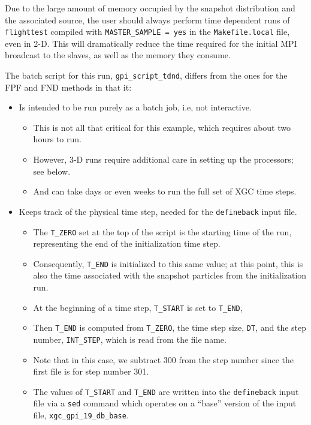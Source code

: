 \documentclass[12pt]{report}
\begin{document}
Due to the large amount of memory occupied by the snapshot
distribution and the associated source, the user should
always perform time dependent runs of
{\tt flighttest} compiled with
\verb+MASTER_SAMPLE = yes+ in the {\tt Makefile.local}
file, even in 2-D.  This will dramatically reduce
the time required for the initial MPI broadcast
to the slaves, as well as the memory they consume.

The batch script for this run, {\tt gpi\_script\_tdnd},
differs from the ones for the FPF and FND methods in
that it:
\begin{itemize}
\item Is intended to be run purely as a batch job,
  i.e, not interactive.
  \begin{itemize}
  \item This is not all that critical for this example,
    which requires about two hours to run.
  \item However, 3-D runs require additional care in
    setting up the processors; see below.
  \item And can take days or even weeks to run the full set of
    XGC time steps.
  \end{itemize}
\item Keeps track of the physical time step, needed for the
  {\tt defineback} input file.
  \begin{itemize}
  \item The \verb+T_ZERO+ set at the top of the script is the
    starting time of the run, representing the end of the
    initialization time step.
  \item Consequently, \verb+T_END+ is initialized to this
    same value; at this point, this is also the time associated
    with the snapshot particles from the initialization run.
  \item At the beginning of a time step, \verb+T_START+ is
    set to \verb+T_END+,
  \item Then \verb+T_END+ is computed from \verb+T_ZERO+, the
    time step size, \verb+DT+, and the step number, \verb+INT_STEP+,
    which is read from the file name.
  \item Note that in this case, we subtract 300 from the step number
    since the first file is for step number 301.
  \item The values of \verb+T_START+ and \verb+T_END+ are written
    into the {\tt defineback} input file via a {\tt sed} command
    which operates on a ``base'' version of the input file,
    {\tt xgc\_gpi\_19\_db\_base}.
    \end{itemize}

\end{itemize}
\end{document}
